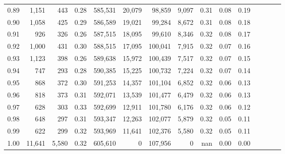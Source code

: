 \begin{tabular}{rrrcrrrrrrrrrrr}
0.89 &   1,151 &    443 &                                       0.28 &  585,531 &   20,079 &   98,859 &    9,097 &  0.31 &  0.08 &                         0.19 \\
0.90 &   1,058 &    425 &                                       0.29 &  586,589 &   19,021 &   99,284 &    8,672 &  0.31 &  0.08 &                         0.18 \\
0.91 &     926 &    326 &                                       0.26 &  587,515 &   18,095 &   99,610 &    8,346 &  0.32 &  0.08 &                         0.17 \\
0.92 &   1,000 &    431 &                                       0.30 &  588,515 &   17,095 &  100,041 &    7,915 &  0.32 &  0.07 &                         0.16 \\
0.93 &   1,123 &    398 &                                       0.26 &  589,638 &   15,972 &  100,439 &    7,517 &  0.32 &  0.07 &                         0.15 \\
0.94 &     747 &    293 &                                       0.28 &  590,385 &   15,225 &  100,732 &    7,224 &  0.32 &  0.07 &                         0.14 \\
0.95 &     868 &    372 &                                       0.30 &  591,253 &   14,357 &  101,104 &    6,852 &  0.32 &  0.06 &                         0.13 \\
0.96 &     818 &    373 &                                       0.31 &  592,071 &   13,539 &  101,477 &    6,479 &  0.32 &  0.06 &                         0.13 \\
0.97 &     628 &    303 &                                       0.33 &  592,699 &   12,911 &  101,780 &    6,176 &  0.32 &  0.06 &                         0.12 \\
0.98 &     648 &    297 &                                       0.31 &  593,347 &   12,263 &  102,077 &    5,879 &  0.32 &  0.05 &                         0.11 \\
0.99 &     622 &    299 &                                       0.32 &  593,969 &   11,641 &  102,376 &    5,580 &  0.32 &  0.05 &                         0.11 \\
1.00 &  11,641 &  5,580 &                                       0.32 &  605,610 &        0 &  107,956 &        0 &   nan &  0.00 &                         0.00 \\
\bottomrule
\end{tabular}
